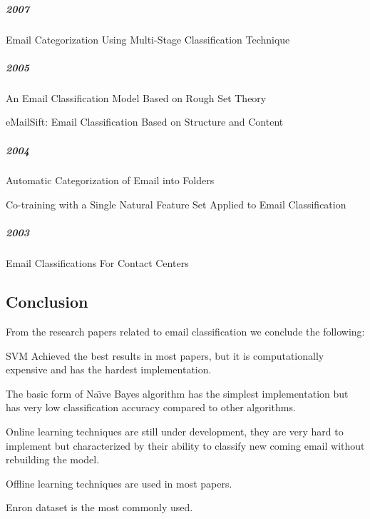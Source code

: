 \subparagraph{2007}
\begin{my_itemize}
  \item Email Categorization Using Multi-Stage Classification Technique \cite{MD07}
\end{my_itemize}

\subparagraph{2005}
\begin{my_itemize}
  \item An Email Classification Model Based on Rough Set Theory \cite{WENQING05}
  \item eMailSift: Email Classification Based on Structure and Content \cite{sift01}
\end{my_itemize}

\subparagraph{2004}
\begin{my_itemize}
  \item Automatic Categorization of Email into Folders \cite{RON04}
  \item Co-training with a Single Natural Feature Set Applied to Email Classification \cite{mous04}
\end{my_itemize}

\subparagraph{2003}
\begin{my_itemize}
  \item Email Classifications For Contact Centers \cite{ANI03}
\end{my_itemize}


\subsection{Conclusion}
From the research papers related to email classification we conclude the following:
\begin{my_itemize}
    \item SVM Achieved the best results in most papers, but it is computationally expensive and has the hardest implementation.
    \item The basic form of Na\"{\i}ve Bayes algorithm has the simplest implementation but has very low classification accuracy compared to other algorithms.
    \item Online learning techniques are still under development, they are very hard to implement but characterized by their
    ability to classify new coming email without rebuilding the model.
    \item Offline learning techniques are used in most papers.
    \item Enron dataset is the most commonly used.
\end{my_itemize}

